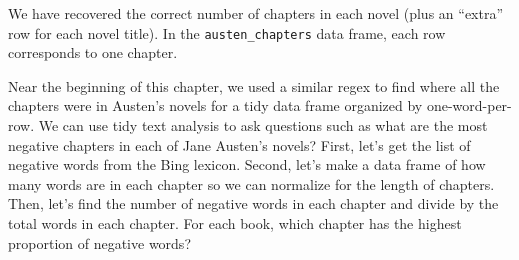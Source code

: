 \documentclass[
]{book}
\begin{document}
We have recovered the correct number of chapters in each novel (plus an ``extra'' row for each novel title). In the \texttt{austen\_chapters} data frame, each row corresponds to one chapter.

Near the beginning of this chapter, we used a similar regex to find where all the chapters were in Austen's novels for a tidy data frame organized by one-word-per-row. We can use tidy text analysis to ask questions such as what are the most negative chapters in each of Jane Austen's novels? First, let's get the list of negative words from the Bing lexicon. Second, let's make a data frame of how many words are in each chapter so we can normalize for the length of chapters. Then, let's find the number of negative words in each chapter and divide by the total words in each chapter. For each book, which chapter has the highest proportion of negative words?
\end{document}
